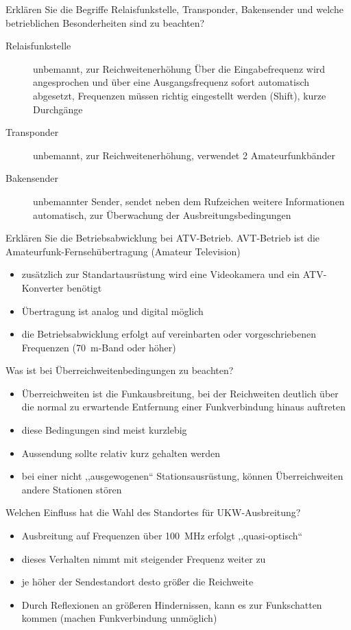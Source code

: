 \documentclass[avery5371,grid,frame,a4paper]{flashcards}
\newcommand{\card}[3]{
  \begin{flashcard}[{\chap} -- #1]{#2}#3\end{flashcard}
}
\begin{document}
\card{63}{Erklären Sie die Begriffe Relaisfunkstelle, Transponder, Bakensender und welche betrieblichen Besonderheiten sind zu beachten?}{
  \small
  \begin{description}
    \item[Relaisfunkstelle] unbemannt, zur Reichweitenerhöhung
      Über die Eingabefrequenz wird angesprochen und über eine Ausgangsfrequenz sofort automatisch abgesetzt, Frequenzen müssen richtig eingestellt werden (Shift), kurze Durchgänge
    \item[Transponder] unbemannt, zur Reichweitenerhöhung, verwendet 2 Amateurfunkbänder
    \item[Bakensender] unbemannter Sender, sendet neben dem Rufzeichen weitere Informationen automatisch, zur Überwachung der Ausbreitungsbedingungen
  \end{description}
}
\card{64}{Erklären Sie die Betriebsabwicklung bei ATV-Betrieb.}{
  AVT-Betrieb ist die Amateurfunk-Fernsehübertragung (Amateur Television)
  \begin{itemize}
    \item zusätzlich zur Standartausrüstung wird eine Videokamera und ein ATV-Konverter benötigt
    \item Übertragung ist analog und digital möglich
    \item die Betriebsabwicklung erfolgt auf vereinbarten oder vorgeschriebenen Frequenzen (\SI{70}{\metre}-Band oder höher)
  \end{itemize}
}
\card{65}{Was ist bei Überreichweitenbedingungen zu beachten?}{
  \small
  \begin{itemize}
    \item Überreichweiten ist die Funkausbreitung, bei der Reichweiten deutlich über die normal zu erwartende Entfernung einer Funkverbindung hinaus auftreten
    \item diese Bedingungen sind meist kurzlebig
    \item Aussendung sollte relativ kurz gehalten werden
    \item bei einer nicht ,,ausgewogenen`` Stationsausrüstung, können Überreichweiten andere Stationen stören
  \end{itemize}
}
\card{66}{Welchen Einfluss hat die Wahl des Standortes für UKW-Ausbreitung?}{
  \begin{itemize}\itemsep0pt
    \item Ausbreitung auf Frequenzen über \SI{100}{\mega\Hz} erfolgt ,,quasi-optisch``
    \item dieses Verhalten nimmt mit steigender Frequenz weiter zu
    \item je höher der Sendestandort desto größer die Reichweite
    \item Durch Reflexionen an größeren Hindernissen, kann es zur Funkschatten kommen (machen Funkverbindung unmöglich)
  \end{itemize}
}
\end{document}
